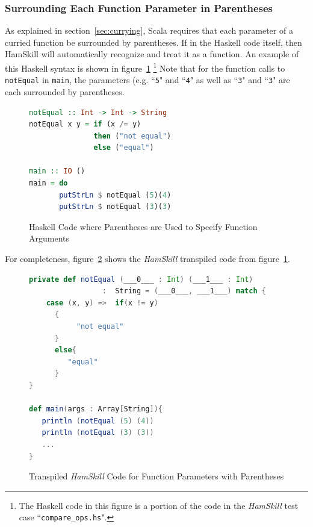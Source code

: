 \documentclass{report}
\begin{document}
\subsubsection{Surrounding Each Function Parameter in Parentheses}

As explained in section~\ref{sec:currying}, Scala requires that each parameter of a curried function be surrounded by parentheses. If in the Haskell code itself, then HamSkill will automatically recognize and treat it as a function.  An example of this Haskell syntax is shown in figure~\ref{fig:haskellFunctionParenthesesFuncArgs} \footnote{The Haskell code in this figure is a portion of the code in the \textit{HamSkill} test case ``\texttt{compare\_ops.hs}".}  Note that for the function calls to \texttt{notEqual} in \texttt{main}, the parameters (e.g. ``\texttt{5}" and ``\texttt{4}" as well as ``\texttt{3}" and ``\texttt{3}" are each surrounded by parentheses.

\begin{figure}[H]
\begin{mdframed}
\begin{lstlisting}[language=Haskell]
notEqual :: Int -> Int -> String
notEqual x y = if (x /= y)
               then ("not equal")
               else ("equal")
               
main :: IO ()
main = do 
       putStrLn $ notEqual (5)(4)
       putStrLn $ notEqual (3)(3)
\end{lstlisting}
\end{mdframed}
\caption{Haskell Code where Parentheses are Used to Specify Function Arguments}\label{fig:haskellFunctionParenthesesFuncArgs}
\end{figure}

For completeness, figure~\ref{fig:scalaFunctionParenthesesFuncArgs} shows the \textit{HamSkill} transpiled code from figure~\ref{fig:haskellFunctionParenthesesFuncArgs}.

\begin{figure}[H]
\begin{mdframed}
\begin{lstlisting}[language=Scala, showstringspaces=false]
private def notEqual (___0___ : Int) (___1___ : Int) 
                 :  String = (___0___, ___1___) match {
    case (x, y) =>  if(x != y)
      {
           "not equal"
      }
      else{
         "equal"
      }
} 
  
def main(args : Array[String]){
   println (notEqual (5) (4))
   println (notEqual (3) (3))
   ...
}
\end{lstlisting}
\end{mdframed}
\caption{Transpiled \textit{HamSkill} Code for Function Parameters with Parentheses}\label{fig:scalaFunctionParenthesesFuncArgs}
\end{figure}
\end{document}

